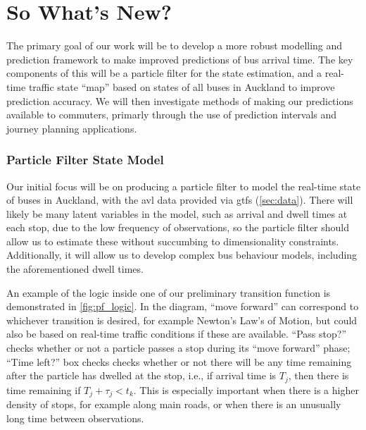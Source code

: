 \documentclass[12pt,a4paper]{article}
\begin{document}
\section{So What's New?}
\label{sec:whatsnew}

The primary goal of our work will be to develop a more robust modelling
and prediction framework to make improved predictions of bus arrival time.
The key components of this will be a particle filter for the state estimation,
and a real-time traffic state ``map'' based on states of all buses in Auckland
to improve prediction accuracy.
We will then investigate methods of making our predictions available to commuters,
primarly through the use of prediction intervals and journey planning applications.


\subsubsection*{Particle Filter State Model}

Our initial focus will be on producing a particle filter to model the real-time state
of buses in Auckland,
with the \gls{avl} data provided via \gls{gtfs} (\cref{sec:data}).
There will likely be many latent variables in the model,
such as arrival and dwell times at each stop,
due to the low frequency of observations,
so the particle filter should allow us to estimate these without
succumbing to dimensionality constraints.
Additionally, it will allow us to develop complex bus behaviour models,
including the aforementioned dwell times.


An example of the logic inside one of our preliminary transition function is demonstrated in \cref{fig:pf_logic}.
In the diagram, ``move forward'' can correspond to whichever transition is desired,
for example Newton's Law's of Motion,
but could also be based on real-time traffic conditions if these are available.
``Pass stop?'' checks whether or not a particle passes a stop during its ``move forward'' phase;
``Time left?'' box checks checks whether or not there will be any time remaining after the particle
has dwelled at the stop, 
i.e., if arrival time is $T_j$, then there is time remaining if $T_j + \tau_j < t_k$.
This is especially important when there is a higher density of stops,
for example along main roads,
or when there is an unusually long time between observations.
\end{document}
